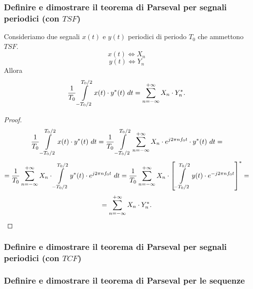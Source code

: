 \documentclass[12pt,oneside,openany]{memoir}
\numberwithin{equation}{subsection}
\newcommand{\dt}{\ dt}
\begin{document}
\subsubsection{Definire e dimostrare il teorema di Parseval per segnali
periodici (con $TSF$)}
Consideriamo due segnali $x(t)$ e $y(t)$ periodici di periodo $T_0$ che
ammettono $TSF$.
\[
    x(t) \iff X_n
\]
\[
    y(t) \iff Y_n
\]
Allora
\[
    \frac{1}{T_0} \int\displaylimits_{-T_0/2}^{T_0/2} x(t) \cdot y^*(t) \dt =
    \sum\displaylimits_{n = -\infty}^{+\infty} X_n \cdot Y^*_n.
\]
\begin{proof}
\[
    \frac{1}{T_0} \int\displaylimits_{-T_0/2}^{T_0/2} x(t) \cdot y^*(t) \dt =
    \frac{1}{T_0} \int\displaylimits_{-T_0/2}^{T_0/2}
    \sum\displaylimits_{n = -\infty}^{+\infty} X_n \cdot e^{j 2 \pi n f_0 t}
    \cdot y^*(t) \dt =
\]
\[
    = \frac{1}{T_0} \sum\displaylimits_{n = -\infty}^{+\infty} X_n \cdot
    \int\displaylimits_{-T_0/2}^{T_0/2} y^*(t) \cdot e^{j 2 \pi n f_0 t} \dt =
    \frac{1}{T_0} \sum\displaylimits_{n = -\infty}^{+\infty} X_n \cdot
    \left[
        \int\displaylimits_{-T_0/2}^{T_0/2} y(t) \cdot e^{-j 2 \pi n f_0 t}
    \right]^* =
\]
\[
    = \sum\displaylimits_{n = -\infty}^{+\infty} X_n \cdot Y^*_n.
\]
\end{proof}


\subsubsection{Definire e dimostrare il teorema di Parseval per segnali
periodici (con $TCF$)}


\subsubsection{Definire e dimostrare il teorema di Parseval per le sequenze}

\end{document}
